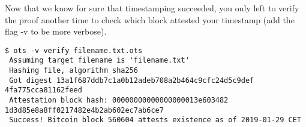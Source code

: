 \begin{itemize}
\bigskip
\noindent
Now that we know for sure that timestamping succeeded, you only left to verify the proof another time to check which block attested your timestamp (add the flag \colorbox{Grey!10}{-v} to be more verbose).\bigskip
\begin{lstlisting}[breakatwhitespace=true]
 $ ots -v verify filename.txt.ots
 Assuming target filename is 'filename.txt'
 Hashing file, algorithm sha256
 Got digest 13a1f687ddb7c1a0b12adeb708a2b464c9cfc24d5c9def 4fa775cca81162feed
 Attestation block hash: 00000000000000000013e603482 1d3d85e8a8ff0217482e4b2ab602ec7ab6ce7
 Success! Bitcoin block 560604 attests existence as of 2019-01-29 CET
\end{lstlisting}
\end{itemize}


